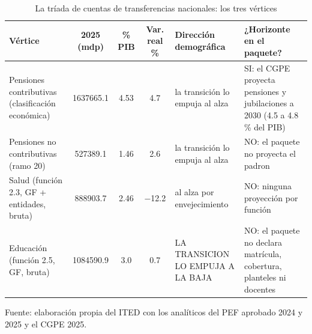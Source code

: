 \begin{table}[htbp]
\centering
\caption{La tríada de cuentas de transferencias nacionales: los tres vértices}
\label{tab:C13_1}
\footnotesize
\setlength{\tabcolsep}{4pt}
\begin{tabular}{L{3.0cm}SSSL{2.4cm}L{3.2cm}}
\toprule
{Vértice} & {2025 (mdp)} & {\% PIB} & {Var. real \%} & {Dirección demográfica} & {¿Horizonte en el paquete?} \\
\midrule
{Pensiones contributivas (clasificación económica)} & \num{1637665.1} & \num{4.53} & \num{4.7} & {la transición lo empuja al alza} & {SI: el CGPE proyecta pensiones y jubilaciones a 2030 (4.5 a 4.8 \% del PIB)} \\
{Pensiones no contributivas (ramo 20)} & \num{527389.1} & \num{1.46} & \num{2.6} & {la transición lo empuja al alza} & {NO: el paquete no proyecta el padron} \\
{Salud (función 2.3, GF + entidades, bruta)} & \num{888903.7} & \num{2.46} & \num{-12.2} & {al alza por envejecimiento} & {NO: ninguna proyección por función} \\
{Educación (función 2.5, GF, bruta)} & \num{1084590.9} & \num{3.0} & \num{0.7} & {LA TRANSICION LO EMPUJA A LA BAJA} & {NO: el paquete no declara matrícula, cobertura, planteles ni docentes} \\
\bottomrule
\end{tabular}
\par\vspace{2pt}\footnotesize Fuente: elaboración propia del ITED con los analíticos del PEF aprobado 2024 y 2025 y el CGPE 2025.
\end{table}
